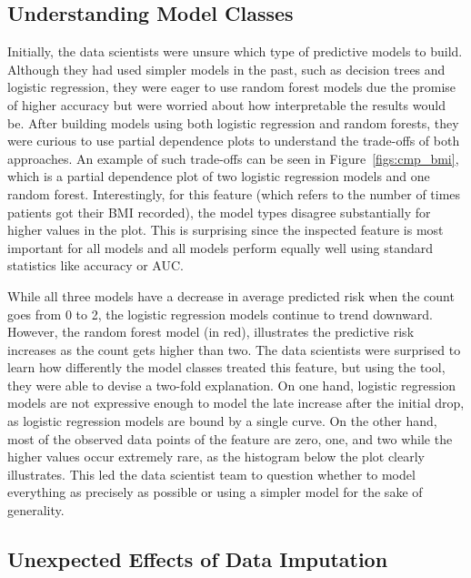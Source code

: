 \subsection{Understanding Model Classes}

Initially, the data scientists were unsure which type of predictive models to build.  Although they had used simpler models in the past, such as decision trees and logistic regression, they were eager to use random forest models due the promise of higher accuracy but were worried about how interpretable the results would be.
After building models using both logistic regression and random forests, they were curious to use partial dependence plots to understand the trade-offs of both approaches. An example of such trade-offs can be seen in Figure~\ref{figs:cmp_bmi}, which is a partial dependence plot of two logistic regression models and one random forest. Interestingly, for this feature (which refers to the number of times patients got their BMI recorded), the model types disagree substantially for higher values in the plot. This is surprising since the inspected feature is most important for all models and
all models perform equally well using standard statistics like accuracy or AUC.

While all three models have a decrease in average predicted risk when the count goes from 0 to 2, the logistic regression models continue to trend downward.  However, the random forest model (in red), illustrates the predictive risk increases as the count gets higher than two.  The data scientists were surprised to learn how differently the model classes treated this feature, but using the tool, they were able to devise a two-fold explanation.  On one hand, logistic regression models are not expressive enough to model the late increase after the initial drop, as logistic regression models are bound by a single curve.  On the other hand, most of the observed data points of the feature are zero, one, and two while the higher values occur extremely rare, as the histogram below the plot clearly illustrates.  This led the data scientist team to question whether to model everything as precisely as possible or using a simpler model for the sake of generality.

\subsection{Unexpected Effects of Data Imputation}


